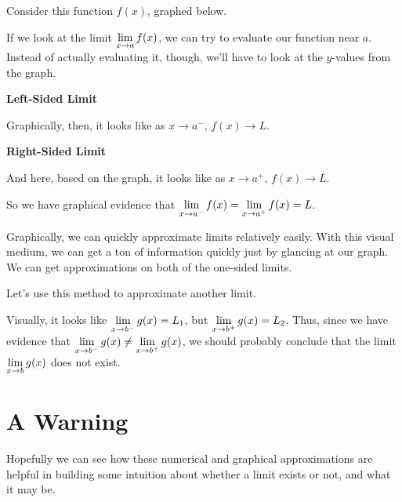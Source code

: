 Consider this function $f(x)$, graphed below.


If we look at the limit $\displaystyle \lim_{x\to a} f(x)$, we can try to evaluate our function near $a$.
Instead of actually evaluating it, though, we'll have to look at the $y$-values from the graph.

\textbf{Left-Sided Limit}


Graphically, then, it looks like as $x\to a^-$, $f(x) \to L$.

\textbf{Right-Sided Limit}


And here, based on the graph, it looks like as $x\to a^+$, $f(x)\to L$.

So we have graphical evidence that $\displaystyle \lim_{x\to a^-} f(x) = \displaystyle \lim_{x\to a^+} f(x) = L$.

Graphically, we can quickly approximate limits relatively easily.
With this visual medium, we can get a ton of information quickly just by glancing at our graph.
We can get approximations on both of the one-sided limits.



Let's use this method to approximate another limit.



Visually, it looks like $\displaystyle \lim_{x\to b^-} g(x) = L_1$, but $\displaystyle \lim_{x\to b^+} g(x) = L_2$. Thus, since we have evidence that $\displaystyle \lim_{x\to b^-} g(x) \neq \displaystyle \lim_{x\to b^+} g(x)$, we should probably conclude that the limit $\displaystyle \lim_{x\to b} g(x)$ does not exist.

\section*{A Warning}

Hopefully we can see how these numerical and graphical approximations are helpful in building some intuition about whether a limit exists or not, and what it may be.

